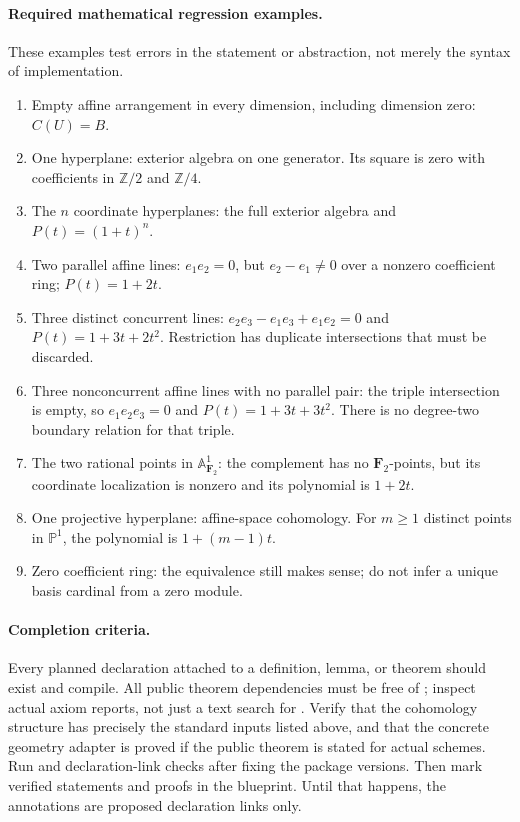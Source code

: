 \documentclass[11pt]{article}
\newcommand{\A}{\mathbb A}
\newcommand{\PP}{\mathbb P}
\newcommand{\Z}{\mathbb Z}
\newcommand{\planned}[1]{\texttt{\detokenize{#1}}}
\theoremstyle{definition}
\theoremstyle{remark}
\begin{document}
\paragraph{Required mathematical regression examples.}
These examples test errors in the statement or abstraction, not merely the syntax of implementation.
\begin{enumerate}
\item Empty affine arrangement in every dimension, including dimension zero: $C(U)=B$.
\item One hyperplane: exterior algebra on one generator. Its square is zero with coefficients in $\Z/2$ and $\Z/4$.
\item The $n$ coordinate hyperplanes: the full exterior algebra and $P(t)=(1+t)^n$.
\item Two parallel affine lines: $e_1e_2=0$, but $e_2-e_1\ne0$ over a nonzero coefficient ring; $P(t)=1+2t$.
\item Three distinct concurrent lines: $e_2e_3-e_1e_3+e_1e_2=0$ and $P(t)=1+3t+2t^2$. Restriction has duplicate intersections that must be discarded.
\item Three nonconcurrent affine lines with no parallel pair: the triple intersection is empty, so $e_1e_2e_3=0$ and $P(t)=1+3t+3t^2$. There is no degree-two boundary relation for that triple.
\item The two rational points in $\A^1_{\mathbf F_2}$: the complement has no $\mathbf F_2$-points, but its coordinate localization is nonzero and its polynomial is $1+2t$.
\item One projective hyperplane: affine-space cohomology. For $m\geq1$ distinct points in $\PP^1$, the polynomial is $1+(m-1)t$.
\item Zero coefficient ring: the equivalence still makes sense; do not infer a unique basis cardinal from a zero module.
\end{enumerate}

\paragraph{Completion criteria.}
Every planned declaration attached to a definition, lemma, or theorem should exist and compile. All public theorem dependencies must be free of \planned{sorryAx}; inspect actual axiom reports, not just a text search for \planned{sorry}. Verify that the cohomology structure has precisely the standard inputs listed above, and that the concrete geometry adapter is proved if the public theorem is stated for actual schemes. Run \planned{lake build} and declaration-link checks after fixing the package versions. Then mark verified statements and proofs in the blueprint. Until that happens, the annotations are proposed declaration links only.
\end{document}
